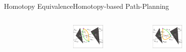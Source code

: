 \begin{frame}{Homotopy Equivalence}{Homotopy-based Path-Planning}
\begin{columns}
\begin{figure}
\end{figure}
\begin{figure}
	\centering
	\includegraphics[width=\linewidth]{figure/equivalence1}
\end{figure}
\begin{figure}
	\centering
	\includegraphics[width=\linewidth]{figure/equivalence2}
\end{figure}
\begin{figure}
	\centering

\end{figure}
\end{columns}
\end{frame}
